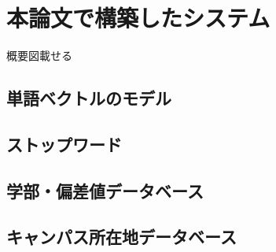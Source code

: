 \section{本論文で構築したシステム}
概要図載せる
\subsection{単語ベクトルのモデル}
\subsection{ストップワード}
\subsection{学部・偏差値データベース}
\subsection{キャンパス所在地データベース}